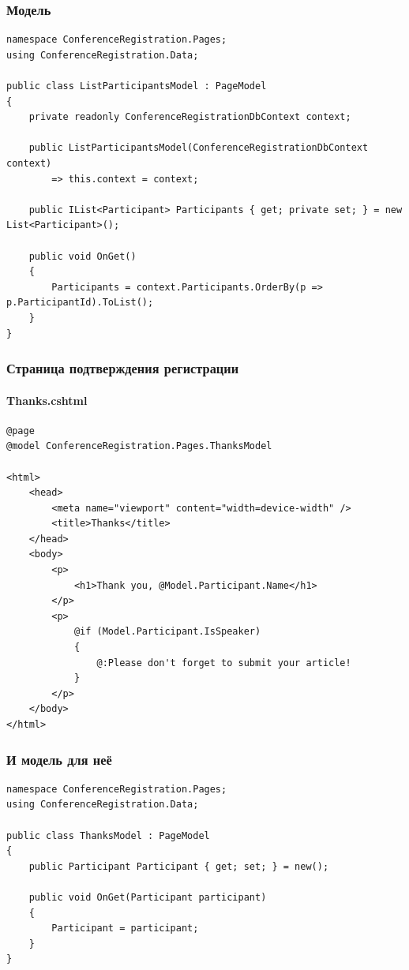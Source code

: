 \documentclass{../../slides-style}
\begin{document}
    \begin{frame}[fragile]
        \frametitle{Модель}
        \begin{footnotesize}
            \begin{verbatim}
namespace ConferenceRegistration.Pages;
using ConferenceRegistration.Data;

public class ListParticipantsModel : PageModel
{
    private readonly ConferenceRegistrationDbContext context;

    public ListParticipantsModel(ConferenceRegistrationDbContext context)
        => this.context = context;

    public IList<Participant> Participants { get; private set; } = new List<Participant>();

    public void OnGet()
    {
        Participants = context.Participants.OrderBy(p => p.ParticipantId).ToList();
    }
}
            \end{verbatim}
        \end{footnotesize}
    \end{frame}

    \begin{frame}[fragile]
        \frametitle{Страница подтверждения регистрации}
        \framesubtitle{Thanks.cshtml}
        \begin{scriptsize}
            \begin{verbatim}
@page
@model ConferenceRegistration.Pages.ThanksModel

<html>
    <head>
        <meta name="viewport" content="width=device-width" />
        <title>Thanks</title>
    </head>
    <body>
        <p>
            <h1>Thank you, @Model.Participant.Name</h1>
        </p>
        <p>
            @if (Model.Participant.IsSpeaker)
            {
                @:Please don't forget to submit your article!
            }
        </p>
    </body>
</html>
            \end{verbatim}
        \end{scriptsize}
    \end{frame}

    \begin{frame}[fragile]
        \frametitle{И модель для неё}
        \begin{footnotesize}
            \begin{verbatim}
namespace ConferenceRegistration.Pages;
using ConferenceRegistration.Data;

public class ThanksModel : PageModel
{
    public Participant Participant { get; set; } = new();

    public void OnGet(Participant participant)
    {
        Participant = participant;
    }
}
            \end{verbatim}
        \end{footnotesize}
    \end{frame}
\end{document}
